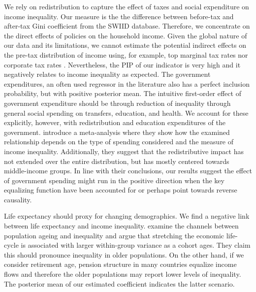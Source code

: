 \begin{refsection}
We rely on redistribution to capture the effect of taxes and social expenditure on income inequality. Our measure is the the difference between before-tax and after-tax Gini coefficient from the \ac{SWIID} database. Therefore, we concentrate on the direct effects of policies on the household income. Given the global nature of our data and its limitations, we cannot estimate the potential indirect effects on the pre-tax distribution of income using, for example, top marginal tax rates \parencite{alvaredoetal2013} nor corporate tax rates \parencite{fuest2018higher}. Nevertheless, the \ac{PIP} of our indicator is very high and it negatively relates to income inequality as expected. The government expenditures, an often used regressor in the literature also has a perfect inclusion probability, but with positive posterior mean. The intuitive first-order effect of government expenditure should be through reduction of inequality through general social spending on transfers, education, and health. We account for these explicitly, however, with redistribution and education expenditures of the government. \textcite{anderson2017does} introduce a meta-analysis where they show how the examined relationship depends on the type of spending considered and the measure of income inequality. Additionally, they suggest that the redistributive impact has not extended over the entire distribution, but has mostly centered towards middle-income groups. In line with their conclusions, our results suggest the effect of government spending might run in the positive direction when the key equalizing function have been accounted for or perhaps point towards reverse causality.

Life expectancy should proxy for changing demographics. We find a negative link between life expectancy and income inequality. \textcite{goldsteinlee2014} examine the channels between population ageing and inequality and argue that stretching the economic life-cycle is associated with larger within-group variance as a cohort ages. They claim this should pronounce inequality in older populations. On the other hand, if we consider retirement age, pension structure in many countries equalize income flows and therefore the older populations may report lower levels of inequality. The posterior mean of our estimated coefficient indicates the latter scenario.


\end{refsection}
